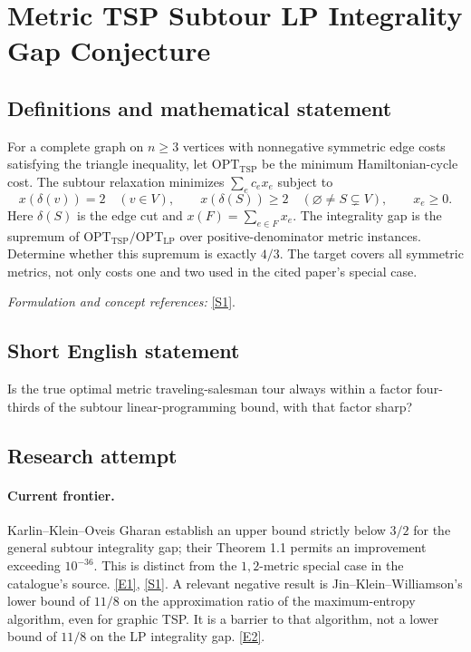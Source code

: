 \documentclass[11pt,a4paper]{article}
\newcommand{\sref}[2]{\hyperlink{source:#1:#2}{[S#2]}}
\newcommand{\eref}[2]{\hyperlink{extra:#1:#2}{[E#2]}}
\newif\ifshowcatalogue
\newcommand{\cataloguescope}[1]{\ifshowcatalogue
 \paragraph{Exact scope in the supplied catalogue.}
 \begin{quote}\small #1\end{quote}\fi}
\numberwithin{equation}{section}
\begin{document}
\setcounter{section}{0}
\clearpage
\section*{\texorpdfstring{Metric TSP Subtour LP Integrality Gap Conjecture}{Metric TSP Subtour LP Integrality Gap Conjecture}}\label{statement}
\subsection{Definitions and mathematical statement}
For a complete graph on $n\ge3$ vertices with nonnegative symmetric edge costs satisfying the triangle inequality, let $\mathrm{OPT}_{\mathrm{TSP}}$ be the minimum Hamiltonian-cycle cost. The subtour relaxation minimizes $\sum_e c_ex_e$ subject to
\[
 x(\delta(v))=2\quad(v\in V),\qquad
 x(\delta(S))\ge2\quad(\varnothing\ne S\subsetneq V),\qquad x_e\ge0.
\]
Here $\delta(S)$ is the edge cut and $x(F)=\sum_{e\in F}x_e$. The integrality gap is the supremum of
$\mathrm{OPT}_{\mathrm{TSP}}/\mathrm{OPT}_{\mathrm{LP}}$ over positive-denominator metric instances. Determine whether this supremum is exactly $4/3$. The target covers all symmetric metrics, not only costs one and two used in the cited paper's special case.
\par\smallskip\textit{Formulation and concept references:} \sref{statement}{1}.
\cataloguescope{Prove or disprove that the integrality gap of the subtour (Held-Karp) LP relaxation of the symmetric metric traveling salesman problem equals 4/3.}
\subsection{Short English statement}
Is the true optimal metric traveling-salesman tour always within a factor four-thirds of the subtour linear-programming bound, with that factor sharp?
\subsection{Research attempt}

\paragraph{Current frontier.}
Karlin--Klein--Oveis Gharan establish an upper bound strictly below
$3/2$ for the general subtour integrality gap; their Theorem 1.1 permits
an improvement exceeding $10^{-36}$. This is distinct from the
$1,2$-metric special case in the catalogue's source. \eref{statement}{1},
\sref{statement}{1}.
A relevant negative result is Jin--Klein--Williamson's lower bound of
$11/8$ on the approximation ratio of the maximum-entropy algorithm,
even for graphic TSP. It is a barrier to that algorithm, not a lower
bound of $11/8$ on the LP integrality gap. \eref{statement}{2}.
\end{document}
